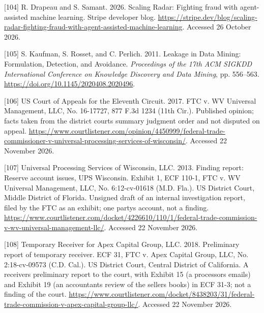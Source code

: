 \documentclass[
  11pt,
]{article}
\newlength{\cslhangindent}
\newlength{\cslentryspacingunit} %
\newenvironment{CSLReferences}[2] %
 {%
  \setlength{\parindent}{0pt}
  \ifodd #1
  \let\oldpar\par
  \def\par{\hangindent=\cslhangindent\oldpar}
  \fi
  \setlength{\parskip}{#2\cslentryspacingunit}
 }%
 {}
\begin{document}
\begin{CSLReferences}{1}{1}
\leavevmode{}%
{[}104{]} R. Drapeau and S. Samant. 2026. Scaling Radar: Fighting fraud
with agent-assisted machine learning. Stripe developer blog.
\url{https://stripe.dev/blog/scaling-radar-fighting-fraud-with-agent-assisted-machine-learning}.
Accessed 26 October 2026.

\leavevmode{}%
{[}105{]} S. Kaufman, S. Rosset, and C. Perlich. 2011. Leakage in Data
Mining: Formulation, Detection, and Avoidance. \emph{Proceedings of the
17th ACM SIGKDD International Conference on Knowledge Discovery and Data
Mining}, pp. 556--563. \url{https://doi.org/10.1145/2020408.2020496}.

\leavevmode{}%
{[}106{]} US Court of Appeals for the Eleventh Circuit. 2017. FTC v. WV
Universal Management, LLC, No. 16-17727, 877 F.3d 1234 (11th Cir.).
Published opinion; facts taken from the district court\textquotesingle s
summary judgment order and not disputed on appeal.
\url{https://www.courtlistener.com/opinion/4450999/federal-trade-commissioner-v-universal-processing-services-of-wisconsin/}.
Accessed 22 November 2026.

\leavevmode{}%
{[}107{]} Universal Processing Services of Wisconsin, LLC. 2013. Finding
report: Reserve account issues, UPS Wisconsin. Exhibit 1, ECF 110-1, FTC
v. WV Universal Management, LLC, No. 6:12-cv-01618 (M.D. Fla.). US
District Court, Middle District of Florida. Unsigned draft of an
internal investigation report, filed by the FTC as an exhibit; one
party\textquotesingle s account, not a finding.
\url{https://www.courtlistener.com/docket/4226610/110/1/federal-trade-commission-v-wv-universal-management-llc/}.
Accessed 22 November 2026.

\leavevmode{}%
{[}108{]} Temporary Receiver for Apex Capital Group, LLC. 2018.
Preliminary report of temporary receiver. ECF 31, FTC v. Apex Capital
Group, LLC, No. 2:18-cv-09573 (C.D. Cal.). US District Court, Central
District of California. A receiver\textquotesingle s preliminary report
to the court, with Exhibit 15 (a processor\textquotesingle s emails) and
Exhibit 19 (an accountant\textquotesingle s review of the
seller\textquotesingle s books) in ECF 31-3; not a finding of the court.
\url{https://www.courtlistener.com/docket/8438203/31/federal-trade-commission-v-apex-capital-group-llc/}.
Accessed 22 November 2026.


\end{CSLReferences}
\end{document}
